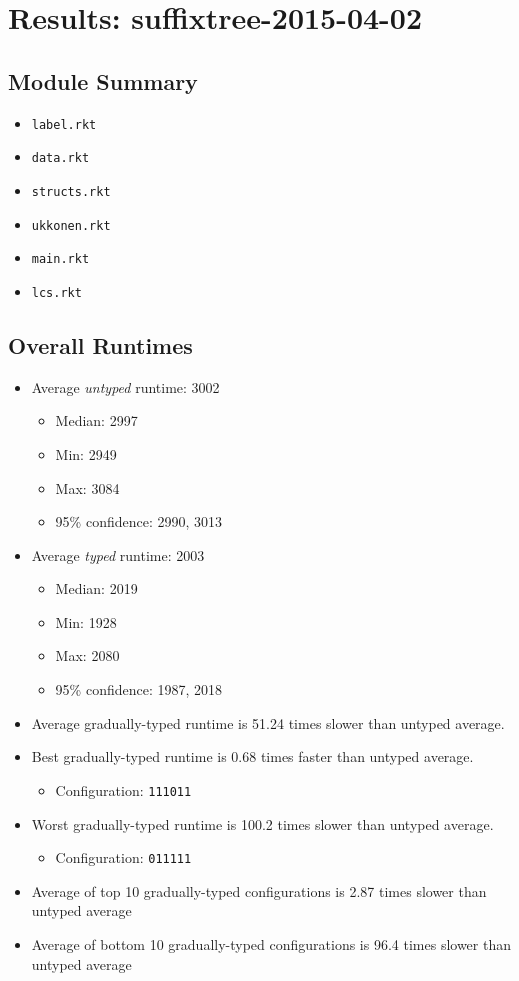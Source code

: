 \documentclass{article}
\newcommand{\mono}[1]{\texttt{#1}}
\begin{document}
\section{Results: suffixtree-2015-04-02}

\subsection{Module Summary}
\begin{itemize}
\item \mono{label.rkt}
\item \mono{data.rkt}
\item \mono{structs.rkt}
\item \mono{ukkonen.rkt}
\item \mono{main.rkt}
\item \mono{lcs.rkt}\end{itemize}

\subsection{Overall Runtimes}
\begin{itemize}
\item Average \emph{untyped} runtime: 3002
  \begin{itemize}
  \item Median: 2997
  \item Min: 2949
  \item Max: 3084
  \item 95\% confidence: 2990, 3013
  \end{itemize}
\item Average \emph{typed} runtime: 2003
  \begin{itemize}
  \item Median: 2019
  \item Min: 1928
  \item Max: 2080
  \item 95\% confidence: 1987, 2018
  \end{itemize}
\item Average gradually-typed runtime is 51.24 times slower than untyped average.
\item Best gradually-typed runtime is 0.68 times faster than untyped average.
\begin{itemize}\item Configuration: \mono{111011}\end{itemize}
\item Worst gradually-typed runtime is 100.2 times slower than untyped average.
\begin{itemize}\item Configuration: \mono{011111}\end{itemize}
\item Average of top 10 gradually-typed configurations is 2.87 times slower than untyped average
\item Average of bottom 10 gradually-typed configurations is 96.4 times slower than untyped average
\end{itemize}
\end{document}
